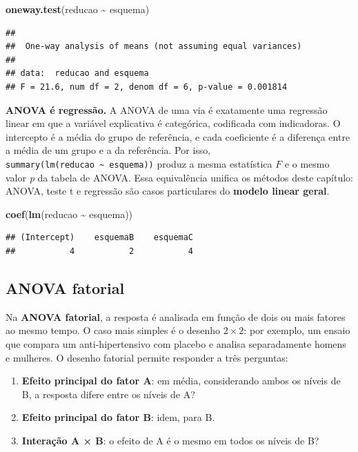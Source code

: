 \documentclass[
]{book}
\newenvironment{Shaded}{\begin{snugshade}}{\end{snugshade}}
\newcommand{\FunctionTok}[1]{\textcolor[rgb]{0.13,0.29,0.53}{\textbf{#1}}}
\newcommand{\NormalTok}[1]{#1}
\newcommand{\SpecialCharTok}[1]{\textcolor[rgb]{0.81,0.36,0.00}{\textbf{#1}}}
\providecommand{\tightlist}{%
  \setlength{\itemsep}{0pt}\setlength{\parskip}{0pt}}
\begin{document}
\begin{Shaded}
\begin{Highlighting}[]
\FunctionTok{oneway.test}\NormalTok{(reducao }\SpecialCharTok{\textasciitilde{}}\NormalTok{ esquema)}
\end{Highlighting}
\end{Shaded}

\begin{verbatim}
## 
##  One-way analysis of means (not assuming equal variances)
## 
## data:  reducao and esquema
## F = 21.6, num df = 2, denom df = 6, p-value = 0.001814
\end{verbatim}

\textbf{ANOVA é regressão.} A ANOVA de uma via é exatamente uma regressão linear em que a variável explicativa é categórica, codificada com indicadoras. O intercepto é a média do grupo de referência, e cada coeficiente é a diferença entre a média de um grupo e a da referência. Por isso, \texttt{summary(lm(reducao\ \textasciitilde{}\ esquema))} produz a mesma estatística \(F\) e o mesmo valor \emph{p} da tabela de ANOVA. Essa equivalência unifica os métodos deste capítulo: ANOVA, teste t e regressão são casos particulares do \textbf{modelo linear geral}.

\begin{Shaded}
\begin{Highlighting}[]
\FunctionTok{coef}\NormalTok{(}\FunctionTok{lm}\NormalTok{(reducao }\SpecialCharTok{\textasciitilde{}}\NormalTok{ esquema))}
\end{Highlighting}
\end{Shaded}

\begin{verbatim}
## (Intercept)    esquemaB    esquemaC 
##           4           2           4
\end{verbatim}

\subsection{ANOVA fatorial}\label{anova-fatorial}

Na \textbf{ANOVA fatorial}, a resposta é analisada em função de dois ou mais fatores ao mesmo tempo. O caso mais simples é o desenho \(2 \times 2\): por exemplo, um ensaio que compara um anti-hipertensivo com placebo e analisa separadamente homens e mulheres. O desenho fatorial permite responder a três perguntas:

\begin{enumerate}
\def\labelenumi{\arabic{enumi}.}
\tightlist
\item
  \textbf{Efeito principal do fator A}: em média, considerando ambos os níveis de B, a resposta difere entre os níveis de A?
\item
  \textbf{Efeito principal do fator B}: idem, para B.
\item
  \textbf{Interação A × B}: o efeito de A é o mesmo em todos os níveis de B?
\end{enumerate}
\end{document}

